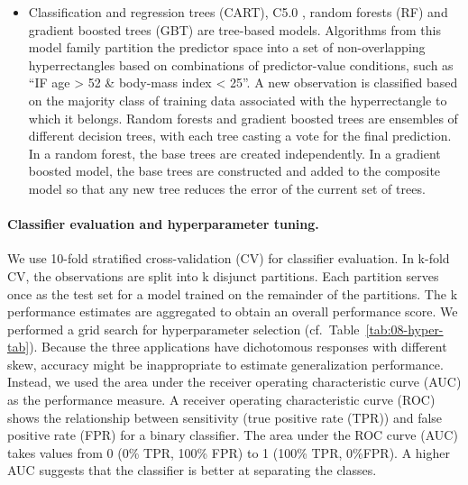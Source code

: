 \documentclass[
  oneside]{book}
\begin{document}
\begin{itemize}
\item
  Classification and regression trees \autocite{BreimanEtAl:CART1984} (CART),
  C5.0 \autocite{Quinlan:C451993},
  random forests \autocite{Breiman:RandomForests2001} (RF) and
  gradient boosted trees (GBT) \autocite{Friedman:PDP2001} are tree-based models.
  Algorithms from this model family partition the predictor space into a set of non-overlapping hyperrectangles based on combinations of predictor-value conditions, such as ``IF age \textgreater{} 52 \& body-mass index \textless{} 25''.
  A new observation is classified based on the majority class of training data associated with the hyperrectangle to which it belongs.
  Random forests and gradient boosted trees are ensembles of different decision trees, with each tree casting a vote for the final prediction.
  In a random forest, the base trees are created independently.
  In a gradient boosted model, the base trees are constructed and added to the composite model so that any new tree reduces the error of the current set of trees.
\end{itemize}

\paragraph*{Classifier evaluation and hyperparameter tuning.}

We use 10-fold stratified cross-validation (CV) for classifier evaluation.
In k-fold CV, the observations are split into k disjunct partitions.
Each partition serves once as the test set for a model trained on the remainder of the partitions.
The k performance estimates are aggregated to obtain an overall performance score.
We performed a grid search for hyperparameter selection (cf.~Table~\ref{tab:08-hyper-tab}).
Because the three applications have dichotomous responses with different skew, accuracy might be inappropriate to estimate generalization performance.
Instead, we used the area under the receiver operating characteristic curve (AUC) as the performance measure.
A receiver operating characteristic curve (ROC) shows the relationship between sensitivity (true positive rate (TPR)) and false positive rate (FPR) for a binary classifier.
The area under the ROC curve (AUC) takes values from 0 (0\% TPR, 100\% FPR) to 1 (100\% TPR, 0\%FPR).
A higher AUC suggests that the classifier is better at separating the classes.
\end{document}
